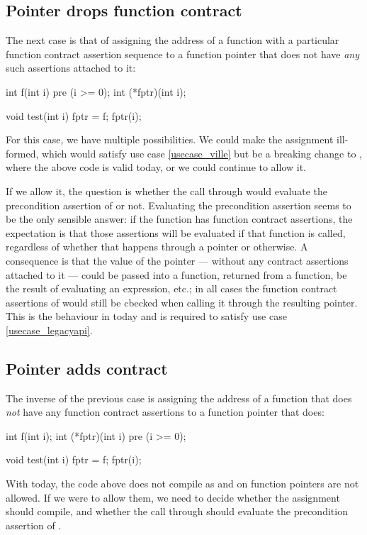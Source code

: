 
\subsection{Pointer drops function contract}
\label{dropping}

The next case is that of assigning the address of a function with a particular function contract assertion sequence to a function pointer that does not have \emph{any} such assertions attached to it:
\begin{codeblock}
int f(int i) pre (i >= 0);
int (*fptr)(int i);

void test(int i) {
  fptr = f; 
  fptr(i); 
}
\end{codeblock}
For this case, we have multiple possibilities. We could make the assignment ill-formed, which would satisfy use case \ref{usecase_ville} but be a breaking change to \cite{P2900R8}, where the above code is valid today, or we could continue to allow it.

If we allow it, the question is whether the call through  would evaluate the precondition assertion of  or not. Evaluating the precondition assertion seems to be the only sensible answer: if the function  has function contract assertions, the expectation is that those assertions will be evaluated if that function is called, regardless of whether that happens through a pointer or otherwise. A consequence is that the value of the pointer  --- without any contract assertions attached to it --- could be passed into a function, returned from a function, be the result of evaluating an expression, etc.; in all cases the function contract assertions of  would still be cbecked when calling it through the resulting pointer. This is the behaviour in \cite{P2900R8} today and is required to satisfy use case \ref{usecase_legacyapi}.


\subsection{Pointer adds contract}
\label{adding}

The inverse of the previous case is assigning the address of a function that does \emph{not} have any function contract assertions to a function pointer that does:
\begin{codeblock}
int f(int i);
int (*fptr)(int i)  pre (i >= 0);

void test(int i) {
  fptr = f;
  fptr(i); 
}
\end{codeblock}
With \cite{P2900R8} today, the code above does not compile as  and  on function pointers are not allowed. If we were to allow them, we need to decide whether the assignment should compile, and whether the call through  should evaluate the precondition assertion of .

